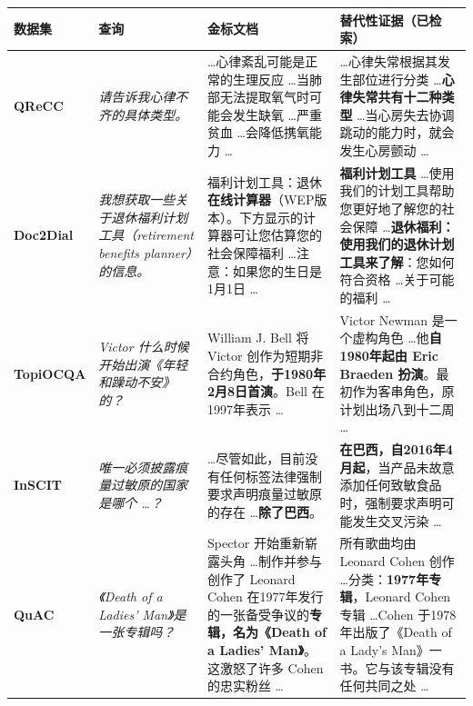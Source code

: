 \begin{table}[htbp]
\small
{}
\label{tab:sparsity_cases}
\centering
\renewcommand{\arraystretch}{1.5}
\begin{tabularx}{\textwidth}{p{1.6cm} p{3.2cm} X X}
\toprule
\textbf{数据集} & \textbf{查询} & \textbf{金标文档} & \textbf{替代性证据（已检索）} \\
\midrule

\textbf{QReCC} & 
\textit{请告诉我心律不齐的具体类型。} & 
\dots 心律紊乱可能是正常的生理反应 \dots 当肺部无法提取氧气时可能会发生缺氧 \dots 严重贫血 \dots 会降低携氧能力 \dots & 
\dots 心律失常根据其发生部位进行分类 \dots \textbf{心律失常共有十二种类型} \dots 当心房失去协调跳动的能力时，就会发生心房颤动 \dots \\
\midrule

\textbf{Doc2Dial} & 
\textit{我想获取一些关于退休福利计划工具（retirement benefits planner）的信息。} & 
福利计划工具：退休\textbf{在线计算器}（WEP版本）。下方显示的计算器可让您估算您的社会保障福利 \dots 注意：如果您的生日是1月1日 \dots & 
\textbf{福利计划工具} \dots 使用我们的计划工具帮助您更好地了解您的社会保障 \dots \textbf{退休福利：使用我们的退休计划工具来了解}：您如何符合资格 \dots 关于可能的福利 \dots \\
\midrule

\textbf{TopiOCQA} & 
\textit{Victor 什么时候开始出演《年轻和躁动不安》的？} & 
William J. Bell 将 Victor 创作为短期非合约角色，\textbf{于1980年2月8日首演}。Bell 在1997年表示 \dots & 
 Victor Newman 是一个虚构角色 \dots 他\textbf{自1980年起由 Eric Braeden 扮演}。最初作为客串角色，原计划出场八到十二周 \dots \\
\midrule

\textbf{InSCIT} & 
\textit{唯一必须披露痕量过敏原的国家是哪个 \dots？} & 
\dots 尽管如此，目前没有任何标签法律强制要求声明痕量过敏原的存在 \dots \textbf{除了巴西}。 & 
 \textbf{在巴西，自2016年4月起}，当产品未故意添加任何致敏食品时，强制要求声明可能发生交叉污染 \dots \\
\midrule

\textbf{QuAC} & 
\textit{《Death of a Ladies' Man》是一张专辑吗？} & 
Spector 开始重新崭露头角 \dots 制作并参与创作了 Leonard Cohen 在1977年发行的一张备受争议的\textbf{专辑，名为《Death of a Ladies' Man》}。这激怒了许多 Cohen 的忠实粉丝 \dots & 
 所有歌曲均由 Leonard Cohen 创作 \dots 分类：\textbf{1977年专辑}，Leonard Cohen 专辑 \dots Cohen 于1978年出版了《Death of a Lady's Man》一书。它与该专辑没有任何共同之处 \dots \\

\bottomrule
\end{tabularx}
\end{table}

